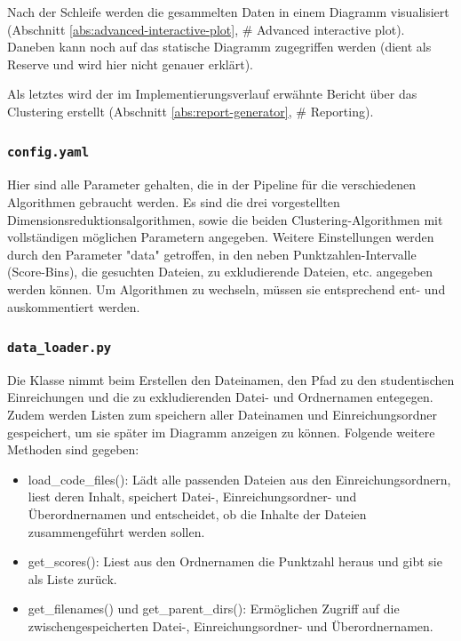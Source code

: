 Nach der Schleife werden die gesammelten Daten in einem Diagramm visualisiert (Abschnitt \ref{abs:advanced-interactive-plot}, \# Advanced interactive plot). Daneben kann noch auf das statische Diagramm zugegriffen werden (dient als Reserve und wird hier nicht genauer erklärt).

Als letztes wird der im Implementierungsverlauf erwähnte Bericht über das Clustering erstellt (Abschnitt \ref{abs:report-generator}, \# Reporting).


\subsubsection*{\texttt{config.yaml}}
\label{abs:config.yaml}
Hier sind alle Parameter gehalten, die in der Pipeline für die verschiedenen Algorithmen gebraucht werden. Es sind die drei vorgestellten Dimensionsreduktionsalgorithmen, sowie die beiden Clustering-Algorithmen mit vollständigen möglichen Parametern angegeben. Weitere Einstellungen werden durch den Parameter "data" getroffen, in den neben Punktzahlen-Intervalle (Score-Bins), die gesuchten Dateien, zu exkludierende Dateien, etc. angegeben werden können. Um Algorithmen zu wechseln, müssen sie entsprechend ent- und auskommentiert werden.


\subsubsection*{\texttt{data\_loader.py}}
\label{abs:data-loader}
Die Klasse nimmt beim Erstellen den Dateinamen, den Pfad zu den studentischen Einreichungen und die zu exkludierenden Datei- und Ordnernamen entegegen. Zudem werden Listen zum speichern aller Dateinamen und Einreichungsordner gespeichert, um sie später im Diagramm anzeigen zu können. Folgende weitere Methoden sind gegeben:
\begin{itemize}
	\item load\_code\_files(): Lädt alle passenden Dateien aus den Einreichungsordnern, liest deren Inhalt, speichert Datei-, Einreichungsordner- und Überordnernamen und entscheidet, ob die Inhalte der Dateien zusammengeführt werden sollen.
	\item get\_scores(): Liest aus den Ordnernamen die Punktzahl heraus und gibt sie als Liste zurück.
	\item get\_filenames() und get\_parent\_dirs(): Ermöglichen Zugriff auf die zwischengespeicherten Datei-, Einreichungsordner- und Überordnernamen.
\end{itemize}


